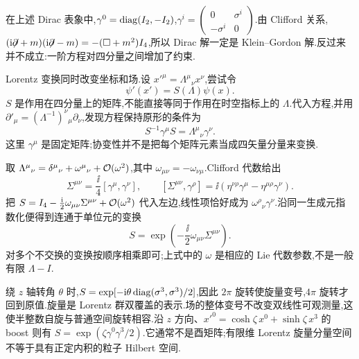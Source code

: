 在上述 Dirac 表象中,$\gamma^0=\operatorname{diag}(I_2,-I_2)$,$\gamma^i=\left(\begin{smallmatrix}0&\sigma^i\\-\sigma^i&0\end{smallmatrix}\right)$.由 Clifford 关系,$(\mathrm i\mathord{\not\mathrel{\partial}}+m)(\mathrm i\mathord{\not\mathrel{\partial}}-m)=-(\Box+m^2)I_4$,所以 Dirac 解一定是 Klein--Gordon 解.反过来并不成立:一阶方程对四分量之间增加了约束.


Lorentz 变换同时改变坐标和场.设 $x'^\mu=\Lambda^\mu{}_{\nu}x^\nu$,尝试令
\begin{equation}
 \psi'(x')=S(\Lambda)\psi(x).
 \label{eq:spinor-transform}
\end{equation}
$S$ 是作用在四分量上的矩阵,不能直接等同于作用在时空指标上的 $\Lambda$.代入方程,并用 $\partial'_\mu=(\Lambda^{-1})^\nu{}_{\mu}\partial_\nu$,发现方程保持原形的条件为
\begin{equation}
 S^{-1}\gamma^\mu S=\Lambda^\mu{}_{\nu}\gamma^\nu.
 \label{eq:spinor-covariance}
\end{equation}
这里 $\gamma^\mu$ 是固定矩阵;协变性并不是把每个矩阵元素当成四矢量分量来变换.

取 $\Lambda^\mu{}_{\nu}=\delta^\mu{}_{\nu}+\omega^\mu{}_{\nu}+\mathcal O(\omega^2)$,其中 $\omega_{\mu\nu}=-\omega_{\nu\mu}$.Clifford 代数给出
\begin{equation}
 \Sigma^{\mu\nu}=\frac{\ii}{4}[\gamma^\mu,\gamma^\nu],
 \qquad
 [\Sigma^{\mu\nu},\gamma^\rho]
 =\ii(\eta^{\nu\rho}\gamma^\mu-\eta^{\mu\rho}\gamma^\nu).
\end{equation}
把 $S=I_4-\frac{\mathrm i}{2}\omega_{\mu\nu}\Sigma^{\mu\nu}+\mathcal O(\omega^2)$ 代入左边,线性项恰好成为 $\omega^\rho{}_{\nu}\gamma^\nu$.沿同一生成元指数化便得到连通于单位元的变换
\begin{equation}
 S=\exp\!\left(-\frac{\ii}{2}\omega_{\mu\nu}\Sigma^{\mu\nu}\right).
\end{equation}
对多个不交换的变换按顺序相乘即可;上式中的 $\omega$ 是相应的 Lie 代数参数,不是一般有限 $\Lambda-I$.

绕 $z$ 轴转角 $\theta$ 时,$S=\exp[-\mathrm i\theta\operatorname{diag}(\sigma^3,\sigma^3)/2]$,因此 $2\pi$ 旋转使旋量变号,$4\pi$ 旋转才回到原值.旋量是 Lorentz 群双覆盖的表示.场的整体变号不改变双线性可观测量,这使半整数自旋与普通空间旋转相容.沿 $z$ 方向、$x'^0=\cosh\zeta\,x^0+\sinh\zeta\,x^3$ 的 boost 则有 $S=\exp(\zeta\gamma^0\gamma^3/2)$.它通常不是酉矩阵;有限维 Lorentz 旋量分量空间不等于具有正定内积的粒子 Hilbert 空间.


